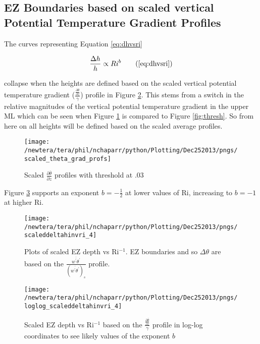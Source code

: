\clearpage
\subsection{\acs{EZ} Boundaries based on scaled vertical Potential Temperature Gradient Profiles}
\label{subsec:ellimscaledprof}

The curves representing Equation \ref{eq:dhvsri} 

\begin{equation}
\frac{\Delta h}{h} \propto Ri ^{b} \tag{\ref{eq:dhvsri}}
\end{equation}

collapse when the heights are defined based on the scaled vertical potential temperature gradient 
($\frac{\frac{\partial \overline{\theta}}{\partial z}}{\gamma}$) profile in Figure \ref{fig:deltahinvri_scaled}.  This stems
from a switch in the relative magnitudes of the vertical potential temperature gradient in the upper \acs{ML} which can be seen when Figure \ref{fig:thresh3} is compared to Figure \ref{fig:thresh}. So from here on all heights will be defined based on the scaled average profiles.   
\\

\begin{figure}[htbp]
    \centering
    \texttt{[image: /newtera/tera/phil/nchaparr/python/Plotting/Dec252013/pngs/scaled\_theta\_grad\_profs]}
    \caption{Scaled $\frac{\partial \overline{\theta}}{\partial z}$ profiles with threshold at .03}
    \label{fig:thresh3}   %
\end{figure}

Figure \ref{fig:loglogdeltahinvri} supports an exponent $b = -\frac{1}{2}$ at lower values of \acs{Ri}, increasing to $b = -1$ at higher \acs{Ri}.    

\clearpage

\begin{figure}[t]
    \centering
    \texttt{[image: /newtera/tera/phil/nchaparr/python/Plotting/Dec252013/pngs/scaleddeltahinvri\_4]}
    \caption[scaled \acs{EZ} depth vs \acs{Ri}$^{-1}$]{Plots of scaled \acs{EZ} depth vs \acs{Ri}$^{-1}$. \acs{EZ} boundaries and so $\Delta \theta$ are based on the $\frac{\overline{w^{'}\theta^{'}}}{(\overline{w^{'}\theta^{'}})_{s}}$ profile.}
    \label{fig:deltahinvri_scaled}   %
\end{figure}                      
\vspace{-50mm}
\begin{figure}[b]
\centering
\texttt{[image: /newtera/tera/phil/nchaparr/python/Plotting/Dec252013/pngs/loglog\_scaleddeltahinvri\_4]}\\
\caption[Log-log plot of scaled \acs{EZ} depth vs \acs{Ri}$^{-1}$]{Scaled \acs{EZ} depth vs \acs{Ri}$^{-1}$ based on the $\frac{\frac{\partial \overline{\theta}}{\partial z}}{\gamma}$ profile in log-log coordinates to see likely values of the exponent $b$}
\label{fig:loglogdeltahinvri}
\end{figure}

